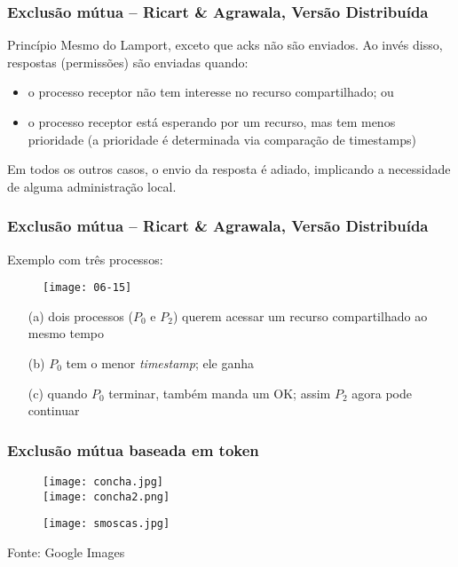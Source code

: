\documentclass[Ligatures=TeX,table,brazil,svgnames,usetotalslideindicator,compress,10pt]{beamer}
\begin{document}
\begin{frame}
  \frametitle{Exclusão mútua -- Ricart \& Agrawala, Versão Distribuída}
  \begin{block}{Princípio}
    Mesmo do Lamport, exceto que acks não são enviados. Ao invés disso, respostas (permissões) são enviadas quando:
    \begin{itemize}
    \item o processo receptor não tem interesse no recurso compartilhado; ou
    \item o processo receptor está esperando por um recurso, mas tem
      menos prioridade (a prioridade é determinada via comparação de
      timestamps)
    \end{itemize}
  \end{block}

    \begin{block}{}
      Em todos os outros casos, o envio da resposta é \alert{adiado}, implicando a necessidade de alguma administração local.
    \end{block}
\end{frame}

\begin{frame}
  \frametitle{Exclusão mútua -- Ricart \& Agrawala, Versão Distribuída}

  Exemplo com três processos:

  \begin{figure}
    \centering
    \texttt{[image: 06-15]}
  \end{figure}

  \begin{itemize}
  \item[(a)] dois processos ($P_0$ e $P_2$) querem acessar um recurso
    compartilhado ao mesmo tempo
  \item[(b)] $P_0$ tem o menor \textit{timestamp}; ele ganha
  \item[(c)] quando $P_0$ terminar, também manda um OK; assim $P_2$ agora pode continuar
  \end{itemize}

\end{frame}

\begin{frame}
  \frametitle{Exclusão mútua baseada em token}
   \begin{figure}
    \centering
    \begin{minipage}{0.45\textwidth}
      \centering
      \texttt{[image: concha.jpg]}\\
      \texttt{[image: concha2.png]}
    \end{minipage}\hfill
    \begin{minipage}{0.45\textwidth}
        \centering
        \texttt{[image: smoscas.jpg]}
    \end{minipage}
  \end{figure}
  \centering
  \footnotesize{Fonte: Google Images}
\end{frame}
\end{document}
